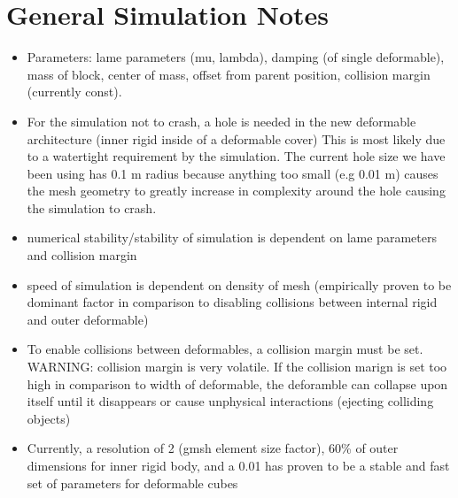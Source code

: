 \documentclass{article}
\begin{document}
\section{General Simulation Notes}
\begin{itemize}
    \item Parameters: lame parameters (mu, lambda), damping (of single deformable), mass of block, center of mass, offset from parent position, collision margin (currently const). 
    \item For the simulation not to crash, a hole is needed in the new deformable architecture (inner rigid inside of a deformable cover)
          This is most likely due to a watertight requirement by the simulation. The current hole size we have been using has 0.1 m radius because
          anything too small (e.g 0.01 m) causes the mesh geometry to greatly increase in complexity around the hole causing the simulation to crash.
    \item numerical stability/stability of simulation is dependent on lame parameters and collision margin
    \item speed of simulation is dependent on density of mesh (empirically proven to be dominant factor in comparison to
          disabling collisions between internal rigid and outer deformable)
    \item To enable collisions between deformables, a collision margin must be set. WARNING: collision margin is very volatile. If the collision marign is set too high in comparison to width of deformable,
          the deforamble can collapse upon itself until it disappears or cause unphysical interactions (ejecting colliding objects)
    \item Currently, a resolution of 2 (gmsh element size factor), 60\% of outer dimensions for inner rigid body, and a 0.01
          has proven to be a stable and fast set of parameters for deformable cubes
\end{itemize}
\end{document}

